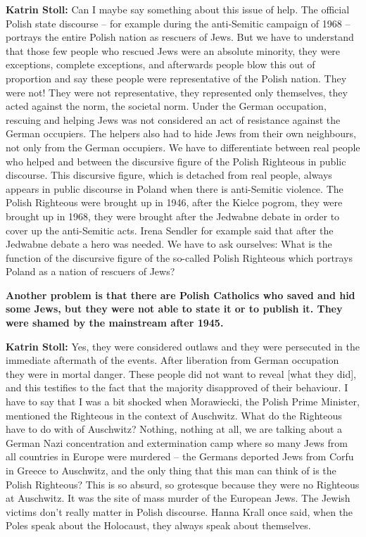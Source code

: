 \textbf{Katrin Stoll:} Can I maybe say something about this issue of help. The official Polish state discourse – for example during the anti-Semitic campaign of 1968 – portrays the entire Polish nation as rescuers of Jews. But we have to understand that those few people who rescued Jews were an absolute minority, they were exceptions, complete exceptions, and afterwards people blow this out of proportion and say these people were representative of the Polish nation. They were not! They were not representative, they represented only themselves, they acted against the norm, the societal norm. Under the German occupation, rescuing and helping Jews was not considered an act of resistance against the German occupiers. The helpers also had to hide Jews from their own neighbours, not only from the German occupiers. We have to differentiate between real people who helped and between the discursive figure of the Polish Righteous in public discourse. This discursive figure, which is detached from real people, always appears in public discourse in Poland when there is anti-Semitic violence. The Polish Righteous were brought up in 1946, after the Kielce pogrom, they were brought up in 1968, they were brought after the Jedwabne debate in order to cover up the anti-Semitic acts. Irena Sendler for example said that after the Jedwabne debate a hero was needed. We have to ask ourselves: What is the function of the discursive figure of the so-called Polish Righteous which portrays Poland as a nation of rescuers of Jews? 

\textbf{Another problem is that there are Polish Catholics who saved and hid some Jews, but they were not able to state it or to publish it. They were shamed by the mainstream after 1945.} 

\textbf{Katrin Stoll:} Yes, they were considered outlaws and they were persecuted in the immediate aftermath of the events. After liberation from German occupation they were in mortal danger. These people did not want to reveal [what they did], and this testifies to the fact that the majority disapproved of their behaviour. I have to say that I was a bit shocked when Morawiecki, the Polish Prime Minister, mentioned the Righteous in the context of Auschwitz. What do the Righteous have to do with of Auschwitz? Nothing, nothing at all, we are talking about a German Nazi concentration and extermination camp where so many Jews from all countries in Europe were murdered – the Germans deported Jews from Corfu in Greece to Auschwitz, and the only thing that this man can think of is the Polish Righteous? This is so absurd, so grotesque because they were no Righteous at Auschwitz. It was the site of mass murder of the European Jews. The Jewish victims don’t really matter in Polish discourse. Hanna Krall once said, when the Poles speak about the Holocaust, they always speak about themselves. 

